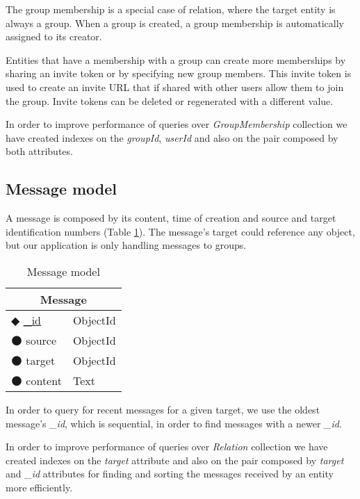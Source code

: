 The group membership is a special case of relation, where the target entity is always a group.
When a group is created, a group membership is automatically assigned to its creator.

Entities that have a membership with a group can create more memberships by sharing an invite token or by specifying new group members. This invite token is used to create an invite \ac{URL} that if shared with other users allow them to join the group. Invite tokens can be deleted or regenerated with a different value.

In order to improve performance of queries over \emph{GroupMembership} collection we have created indexes on the \emph{groupId}, \emph{userId} and also on the pair composed by both attributes.


\subsection{Message model}

A message is composed by its content, time of creation and source and target identification numbers (Table \ref{table:message}). The message's target could reference any object, but our application is only handling messages to groups.

\begin{table}
\centering
\caption{Message model}
\label{table:message}
    \begin{tabular}{|ll|}
        \hline
        \multicolumn{2}{|c|}{\textbf{Message}}      \\ \hline
        $\Diamondblack$ \underline{\_id}  & ObjectId  \\ 
        $\medbullet$ source           & ObjectId    \\ 
        $\medbullet$ target      & ObjectId         \\ 
        $\medbullet$ content      & Text            \\ \hline
    \end{tabular}
\end{table}

In order to query for recent messages for a given target, we use the oldest message's \emph{\_id}, which is sequential, in order to find messages with a newer \emph{\_id}.

In order to improve performance of queries over \emph{Relation} collection we have created indexes on the \emph{target} attribute and also on the pair composed by \emph{target} and \emph{\_id} attributes for finding and sorting the messages received by an entity more efficiently. 

